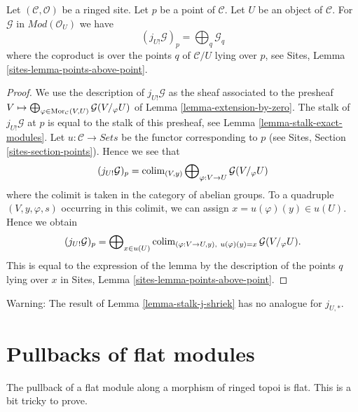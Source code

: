 \begin{lemma}
\label{lemma-stalk-j-shriek}
Let $(\mathcal{C}, \mathcal{O})$ be a ringed site.
Let $p$ be a point of $\mathcal{C}$. Let $U$ be an object of $\mathcal{C}$.
For $\mathcal{G}$ in $\textit{Mod}(\mathcal{O}_U)$ we have
$$
(j_{U!}\mathcal{G})_p =
\bigoplus\nolimits_q \mathcal{G}_q
$$
where the coproduct is over the points $q$ of $\mathcal{C}/U$
lying over $p$, see
Sites, Lemma \ref{sites-lemma-points-above-point}.
\end{lemma}

\begin{proof}
We use the description of $j_{U!}\mathcal{G}$ as the sheaf associated
to the presheaf
$V \mapsto
\bigoplus\nolimits_{\varphi \in \mathop{\mathrm{Mor}}\nolimits_\mathcal{C}(V, U)}
\mathcal{G}(V/_\varphi U)$
of
Lemma \ref{lemma-extension-by-zero}.
The stalk of $j_{U!}\mathcal{G}$ at $p$ is equal to the
stalk of this presheaf, see
Lemma \ref{lemma-stalk-exact-modules}.
Let $u : \mathcal{C} \to \textit{Sets}$ be the functor corresponding
to $p$ (see Sites, Section \ref{sites-section-points}).
Hence we see that
$$
(j_{U!}\mathcal{G})_p = \mathop{\mathrm{colim}}\nolimits_{(V, y)}
\bigoplus\nolimits_{\varphi : V \to U} \mathcal{G}(V/_\varphi U)
$$
where the colimit is taken in the category of abelian groups.
To a quadruple $(V, y, \varphi, s)$ occurring in this colimit, we can assign
$x = u(\varphi)(y) \in u(U)$. Hence we obtain
$$
(j_{U!}\mathcal{G})_p =
\bigoplus\nolimits_{x \in u(U)}
\mathop{\mathrm{colim}}\nolimits_{(\varphi : V \to U, y), \ u(\varphi)(y) = x} \mathcal{G}(V/_\varphi U).
$$
This is equal to the expression of the lemma by the description
of the points $q$ lying over $x$ in
Sites, Lemma \ref{sites-lemma-points-above-point}.
\end{proof}

\begin{remark}
\label{remark-not-pushforward}
Warning: The result of
Lemma \ref{lemma-stalk-j-shriek}
has no analogue for $j_{U, *}$.
\end{remark}












\section{Pullbacks of flat modules}
\label{section-pullback-flat}

\noindent
The pullback of a flat module along a morphism of ringed topoi is flat.
This is a bit tricky to prove.

